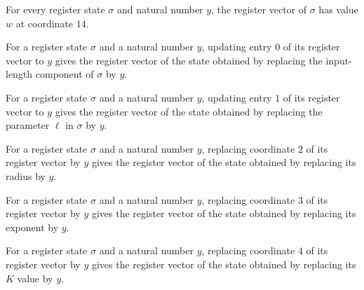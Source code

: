 \begin{lemma}
\label{Randomized.PolyAmp.Reg.v_14}
\leanok
{}
For every register state $\sigma$ and natural number $y$, the register vector of
$\sigma$ has value $w$ at coordinate $14$.
\end{lemma}

\begin{lemma}
\label{Randomized.PolyAmp.Reg.u_0}
\leanok
{}
For a register state $\sigma$ and a natural number $y$, updating entry $0$ of its
register vector to $y$ gives the register vector of the state obtained by replacing the
input-length component of $\sigma$ by $y$.
\end{lemma}

\begin{lemma}
\label{Randomized.PolyAmp.Reg.u_1}
\leanok
{}
For a register state $\sigma$ and a natural number $y$, updating entry $1$ of its
register vector to $y$ gives the register vector of the state obtained by replacing the
parameter $\ell$ in $\sigma$ by $y$.
\end{lemma}

\begin{lemma}
\label{Randomized.PolyAmp.Reg.u_2}
\leanok
{}
For a register state $\sigma$ and a natural number $y$, replacing coordinate $2$ of its
register vector by $y$ gives the register vector of the state obtained by replacing its
radius by $y$.
\end{lemma}

\begin{lemma}
\label{Randomized.PolyAmp.Reg.u_3}
\leanok
{}
For a register state $\sigma$ and a natural number $y$, replacing coordinate $3$ of its
register vector by $y$ gives the register vector of the state obtained by replacing its
exponent by $y$.
\end{lemma}

\begin{lemma}
\label{Randomized.PolyAmp.Reg.u_4}
\leanok
{}
For a register state $\sigma$ and a natural number $y$, replacing coordinate $4$ of its
register vector by $y$ gives the register vector of the state obtained by replacing its
$K$ value by $y$.
\end{lemma}

